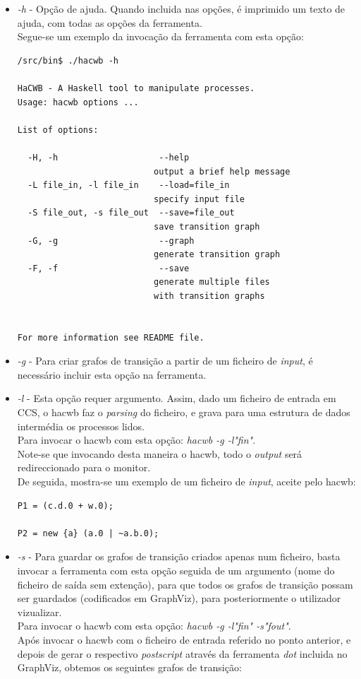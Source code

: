 \begin{itemize}
\item \textit{-h} - Opção de ajuda. Quando incluida nas opções, é imprimido um texto de ajuda, com 
todas as opções da ferramenta.\\
Segue-se um exemplo da invocação da ferramenta com esta opção:\\
\begin{verbatim}
/src/bin$ ./hacwb -h

HaCWB - A Haskell tool to manipulate processes.
Usage: hacwb options ...

List of options:

  -H, -h                    --help           
                           output a brief help message
  -L file_in, -l file_in    --load=file_in   
                           specify input file
  -S file_out, -s file_out  --save=file_out  
                           save transition graph
  -G, -g                    --graph          
                           generate transition graph
  -F, -f                    --save           
                           generate multiple files 
                           with transition graphs


For more information see README file.
\end{verbatim}
\item \textit{-g} - Para criar grafos de transição a partir de um ficheiro de \textit{input}, é necessário 
incluir esta opção na ferramenta.
\item \textit{-l} - Esta opção requer argumento. Assim, dado um ficheiro de entrada em CCS, o hacwb 
faz o \textit{parsing} do ficheiro, e grava para uma estrutura de dados intermédia os processos lidos.\\
Para invocar o hacwb com esta opção: \textit{hacwb -g -l"fin"}.\\
Note-se que invocando desta maneira o hacwb, todo o \textit{output} será redireccionado para o monitor.\\
De seguida, mostra-se um exemplo de um ficheiro de \textit{input}, aceite pelo hacwb:\\
\begin{verbatim}
P1 = (c.d.0 + w.0);

P2 = new {a} (a.0 | ~a.b.0);
\end{verbatim}
\item \textit{-s} - Para guardar os grafos de transição criados apenas num ficheiro, basta invocar a ferramenta 
com esta opção seguida de um argumento (nome do ficheiro de saída sem extenção), para que todos os grafos de 
transição possam ser guardados (codificados em GraphViz), para posteriormente o utilizador vizualizar.\\
Para invocar o hacwb com esta opção: \textit{hacwb -g -l"fin" -s"fout"}.\\
Após invocar o hacwb com o ficheiro de entrada referido no ponto anterior, e depois de gerar o respectivo 
\textit{postscript} através da ferramenta \textit{dot} incluida no GraphViz, obtemos os seguintes grafos de 
transição:


\end{itemize}
